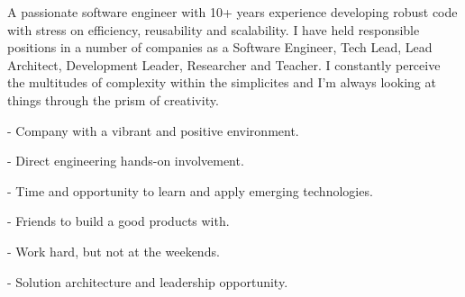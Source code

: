 \documentclass[10pt,a4paper,ragged2e,withhyper]{altacv}
\begin{document}
\vspace{0.5cm}

\begin{paracol}{2}


\begin{raggedright}
  A passionate software engineer with 10+ years experience developing
  robust code with stress on efficiency, reusability and scalability. \newline I have held responsible positions in a number of companies as a Software Engineer, Tech Lead, Lead Architect,
  Development Leader, Researcher and Teacher. I constantly perceive the multitudes of complexity within the simplicites and I'm always looking at things through the prism of creativity.
\end{raggedright}


\switchcolumn


\begin{raggedright}

- Company with a vibrant and positive environment.

- Direct engineering hands-on involvement.

- Time and opportunity to learn and apply emerging technologies.

- Friends to build a good products with.

- Work hard, but not at the weekends.

- Solution architecture and leadership opportunity.

\end{raggedright}



\end{paracol}

\vspace{0.5cm}

\end{document}

